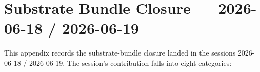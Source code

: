 %

\chapter{Substrate Bundle Closure --- 2026-06-18 / 2026-06-19}
\label{app:substrate-bundle-closure-2026-06-18-19}

This appendix records the substrate-bundle closure landed in the
sessions 2026-06-18 / 2026-06-19. The session's contribution falls
into eight categories:

